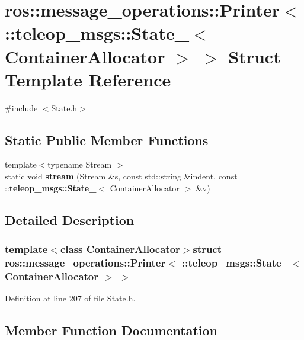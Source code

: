 \section{ros::message\_\-operations::Printer$<$ ::teleop\_\-msgs::State\_\-$<$ ContainerAllocator $>$ $>$ Struct Template Reference}
\label{structros_1_1message__operations_1_1Printer_3_01_1_1teleop__msgs_1_1State___3_01ContainerAllocator_01_4_01_4}


{\ttfamily \#include $<$State.h$>$}

\subsection*{Static Public Member Functions}
\begin{DoxyCompactItemize}
\item 
{\footnotesize template$<$typename Stream $>$ }\\static void {\bf stream} (Stream \&s, const std::string \&indent, const ::{\bf teleop\_\-msgs::State\_\-}$<$ ContainerAllocator $>$ \&v)
\end{DoxyCompactItemize}


\subsection{Detailed Description}
\subsubsection*{template$<$class ContainerAllocator$>$struct ros::message\_\-operations::Printer$<$ ::teleop\_\-msgs::State\_\-$<$ ContainerAllocator $>$ $>$}



Definition at line 207 of file State.h.



\subsection{Member Function Documentation}
